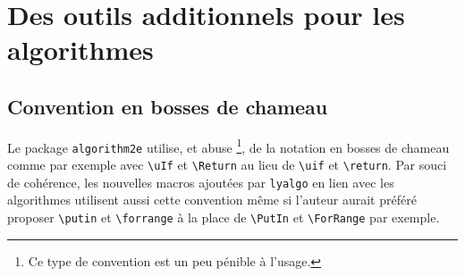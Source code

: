 \documentclass[12pt,a4paper]{article}
\begin{document}
\newpage
\section{Des outils additionnels pour les algorithmes} \label{algo-extra}

\subsection{Convention en bosses de chameau}

Le package \verb+algorithm2e+ utilise, et abuse
\footnote{
	Ce type de convention est un peu pénible à l'usage.
},
de la notation en bosses de chameau comme par exemple avec \verb+\uIf+ et \verb+\Return+ au lieu de \verb+\uif+ et \verb+\return+.
Par souci de cohérence, les nouvelles macros ajoutées par \verb+lyalgo+ en lien avec les algorithmes utilisent aussi cette convention même si l'auteur aurait préféré proposer \verb+\putin+ et \verb+\forrange+ à la place de \verb+\PutIn+ et \verb+\ForRange+ par exemple.
\end{document}
